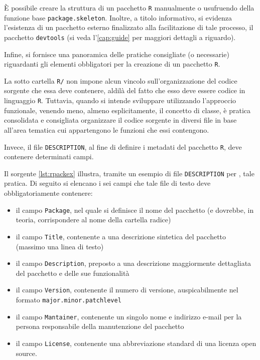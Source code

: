 \`E possibile creare la struttura di un pacchetto \lstinline$R$ manualmente o usufruendo della funzione base \lstinline[language=rstats]{package.skeleton}. Inoltre, a titolo informativo, si evidenza l'esistenza di un pacchetto esterno finalizzato alla facilitazione di tale processo, il pacchetto \lstinline[]|devtools| \citep{DEVTOOLS2013} (si veda l'\vref{cap:guide} per maggiori dettagli a riguardo).

Infine, si fornisce una panoramica delle pratiche consigliate (o necessarie) riguardanti gli elementi obbligatori per la creazione di un pacchetto \lstinline$R$.

La sotto cartella \lstinline$R/$ non impone alcun vincolo sull'organizzazione del codice sorgente che essa deve contenere, aldilà del fatto che esso deve essere codice in linguaggio \lstinline$R$. Tuttavia, quando si intende sviluppare utilizzando l'approccio funzionale, venendo meno, almeno esplicitamente, il concetto di classe, è pratica consolidata e consigliata organizzare il codice sorgente in diversi file in base all'area tematica cui appartengono le funzioni che essi contengono.

Invece, il file \lstinline$DESCRIPTION$, al fine di definire i metadati del pacchetto \lstinline$R$, deve contenere determinati campi.

Il sorgente \ref{lst:rpackex} illustra, tramite un esempio di file \lstinline$DESCRIPTION$ per \rctbn{}, tale pratica.
\vspace*{8pt}\vspace*{8pt}
Di seguito si elencano i sei campi che tale file di testo deve obbligatoriamente contenere:
\begin{itemize}
	\item il campo \lstinline$Package$, nel quale si definisce il nome del pacchetto (e dovrebbe, in teoria, corrispondere al nome della cartella radice)
	\item il campo \lstinline$Title$, contenente a una descrizione sintetica del pacchetto (massimo una linea di testo)
	\item il campo \lstinline$Description$, preposto a una descrizione maggiormente dettagliata del pacchetto e delle sue funzionalità
	\item il campo \lstinline$Version$, contenente il numero di versione, auspicabilmente nel formato \lstinline$major.minor.patchlevel$
	\item il campo \lstinline$Mantainer$, contenente un singolo nome e indirizzo e-mail per la persona responsabile della manutenzione del pacchetto
	\item il campo \lstinline$License$, contenente una abbreviazione standard di una licenza open source.
\end{itemize}

